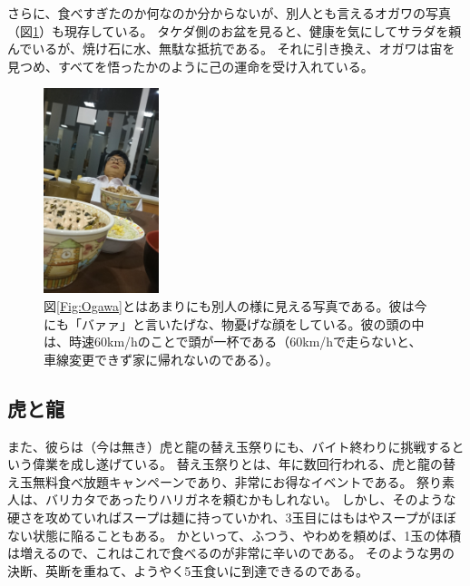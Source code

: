 さらに、食べすぎたのか何なのか分からないが、別人とも言えるオガワの写真（図\ref{Fig:OgawaBetsujin}）も現存している。
タケダ側のお盆を見ると、健康を気にしてサラダを頼んでいるが、焼け石に水、無駄な抵抗である。
それに引き換え、オガワは宙を見つめ、すべてを悟ったかのように己の運命を受け入れている。

\begin{figure}[h]
\centering
\includegraphics[width=0.3\textwidth]{./section/Shokuji/figures/LifeSukiya_3.jpg}
  \caption{図\ref{Fig:Ogawa}とはあまりにも別人の様に見える写真である。彼は今にも「バァァ」と言いたげな、物憂げな顔をしている。彼の頭の中は、時速60km/hのことで頭が一杯である（60km/hで走らないと、車線変更できず家に帰れないのである）。}
\label{Fig:OgawaBetsujin}
\end{figure}

\subsection{虎と龍}
また、彼らは（今は無き）虎と龍の替え玉祭りにも、バイト終わりに挑戦するという偉業を成し遂げている。
替え玉祭りとは、年に数回行われる、虎と龍の替え玉無料食べ放題キャンペーンであり、非常にお得なイベントである。
祭り素人は、バリカタであったりハリガネを頼むかもしれない。
しかし、そのような硬さを攻めていればスープは麺に持っていかれ、3玉目にはもはやスープがほぼない状態に陥ることもある。
かといって、ふつう、やわめを頼めば、1玉の体積は増えるので、これはこれで食べるのが非常に辛いのである。
そのような男の決断、英断を重ねて、ようやく5玉食いに到達できるのである。

